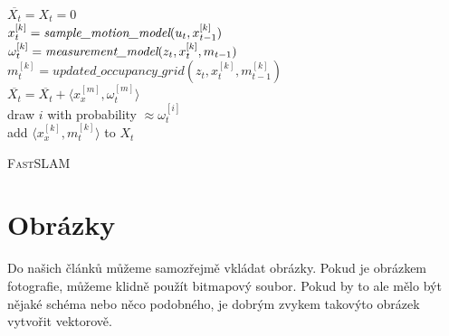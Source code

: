 \documentclass[11pt, a4paper]{article}
\begin{document}
\IncMargin{1.5em}
\begin{algorithm}
    \DontPrintSemicolon
	\SetNlSty{}{}{:}
	\Indm\Indmm
	\Indp\Indpp
	\BlankLine
	$ \overline{X_t}=X_t=0 $ \\
	\For{$k = 1 \emph{ to } M$}
	    {
	        \Indpp
			$x_t^{[k]} = \emph{sample\_motion\_model}(u_t, x_{t-1}^{[k]})$ \\
			$\omega_t^{[k]} = \emph{measurement\_model}(z_t, x_t^{[k]}, m_{t-1})$ \\
			$m_t^{[k]} = updated\_occupancy\_grid(z_t, x_t^{[k]}, m_{t-1}^{[k]})$ \\
			$\overline{X_t} = \overline{X_t} + \langle x_x^{[m]}, \omega_t^{[m]} \rangle$ \\
		}
	\For{$k = 1 {\emph{ to }} M$}
	    {
	        \Indpp
			draw $i$ with probability $\approx \omega_t^{[i]}$ \\
			add $\langle x_x^{[k]}, m_t^{[k]} \rangle$ to $X_t$ \\
		}
    \caption{\textsc{FastSLAM}}
    \label{alg:Fastslam}
\end{algorithm}
\DecMargin{1.5em}

\section{Obrázky}
Do našich článků můžeme samozřejmě vkládat obrázky. Pokud je obrázkem fotografie,
můžeme klidně použít bitmapový soubor. Pokud by to ale mělo být nějaké schéma nebo
něco podobného, je dobrým zvykem takovýto obrázek vytvořit vektorově.
\end{document}
